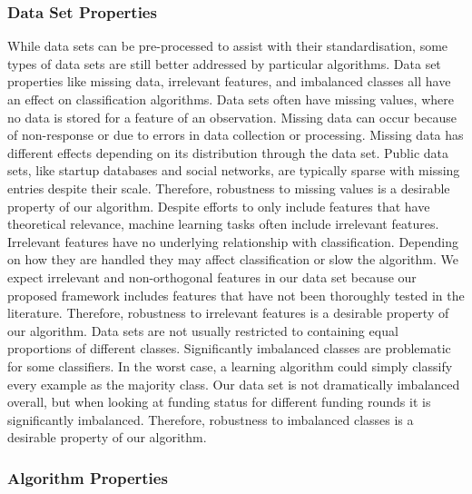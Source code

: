 \documentclass[../thesis/thesis.tex]{subfiles}
\begin{document}
\subsubsection{Data Set Properties}

While data sets can be pre-processed to assist with their standardisation, some types of data sets are still better addressed by particular algorithms. Data set properties like missing data, irrelevant features, and imbalanced classes all have an effect on classification algorithms. Data sets often have missing values, where no data is stored for a feature of an observation. Missing data can occur because of non-response or due to errors in data collection or processing. Missing data has different effects depending on its distribution through the data set. Public data sets, like startup databases and social networks, are typically sparse with missing entries despite their scale. Therefore, robustness to missing values is a desirable property of our algorithm. Despite efforts to only include features that have theoretical relevance, machine learning tasks often include irrelevant features. Irrelevant features have no underlying relationship with classification. Depending on how they are handled they may affect classification or slow the algorithm. We expect irrelevant and non-orthogonal features in our data set because our proposed framework includes features that have not been thoroughly tested in the literature. Therefore, robustness to irrelevant features is a desirable property of our algorithm. Data sets are not usually restricted to containing equal proportions of different classes. Significantly imbalanced classes are problematic for some classifiers. In the worst case, a learning algorithm could simply classify every example as the majority class. Our data set is not dramatically imbalanced overall, but when looking at funding status for different funding rounds it is significantly imbalanced. Therefore, robustness to imbalanced classes is a desirable property of our algorithm.

\subsubsection{Algorithm Properties}
\end{document}
